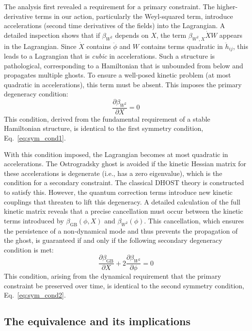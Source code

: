 \documentclass[twocolumn]{aastex631}
\begin{document}
The analysis first revealed a requirement for a primary constraint. The higher-derivative terms in our action, particularly the Weyl-squared term, introduce accelerations (second time derivatives of the fields) into the Lagrangian. A detailed inspection shows that if $\beta_{W^2}$ depends on $X$, the term $\beta_{W^2,X} \dot{X} W$ appears in the Lagrangian. Since $\dot{X}$ contains $\ddot{\phi}$ and $W$ contains terms quadratic in $\ddot{h}_{ij}$, this leads to a Lagrangian that is \textit{cubic} in accelerations. Such a structure is pathological, corresponding to a Hamiltonian that is unbounded from below and propagates multiple ghosts. To ensure a well-posed kinetic problem (at most quadratic in accelerations), this term must be absent. This imposes the primary degeneracy condition:
\begin{equation}
    \frac{\partial\beta_{W^2}}{\partial X} = 0
\end{equation}
This condition, derived from the fundamental requirement of a stable Hamiltonian structure, is identical to the first symmetry condition, Eq.~\eqref{eq:sym_cond1}.

With this condition imposed, the Lagrangian becomes at most quadratic in accelerations. The Ostrogradsky ghost is avoided if the kinetic Hessian matrix for these accelerations is degenerate (i.e., has a zero eigenvalue), which is the condition for a secondary constraint. The classical DHOST theory is constructed to satisfy this. However, the quantum correction terms introduce new kinetic couplings that threaten to lift this degeneracy. A detailed calculation of the full kinetic matrix reveals that a precise cancellation must occur between the kinetic terms introduced by $\beta_{\text{GB}}(\phi,X)$ and $\beta_{W^2}(\phi)$. This cancellation, which ensures the persistence of a non-dynamical mode and thus prevents the propagation of the ghost, is guaranteed if and only if the following secondary degeneracy condition is met:
\begin{equation}
    \frac{\partial\beta_{\text{GB}}}{\partial X} + 2 \frac{\partial\beta_{W^2}}{\partial\phi} = 0
\end{equation}
This condition, arising from the dynamical requirement that the primary constraint be preserved over time, is identical to the second symmetry condition, Eq.~\eqref{eq:sym_cond2}.

\subsection{The equivalence and its implications}
\end{document}
